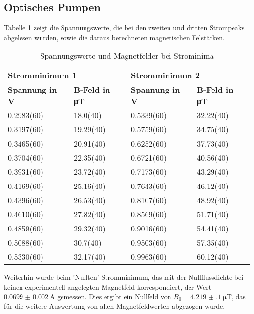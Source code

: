 \documentclass[../main.tex]{subfiles}
\begin{document}
\subsection{Optisches Pumpen}
    Tabelle \ref{tab:PumpenMessdaten} zeigt die Spannungswerte, die bei den zweiten und dritten Strompeaks abgelesen wurden, sowie die daraus berechneten magnetischen Felstärken.

    \begin{table}[H]
        \centering
        \begin{tabular}{l|l|l|l}
            \multicolumn{2}{l|}{\textbf{Stromminimum 1}} & \multicolumn{2}{l}{\textbf{Stromminimum 2}}\\
            \hline
            \textbf{Spannung in V} & \textbf{B-Feld in \si{\micro\tesla}} & \textbf{Spannung in V} & \textbf{B-Feld in \si{\micro\tesla}}\\
            \hline\hline
            0.2983(60) & 18.0(40) & 0.5339(60) & 32.22(40)\\
            \hline
            0.3197(60) & 19.29(40) & 0.5759(60) & 34.75(40)\\
            \hline
            0.3465(60) & 20.91(40) & 0.6252(60) & 37.73(40)\\
            \hline
            0.3704(60) & 22.35(40) & 0.6721(60) & 40.56(40)\\
            \hline
            0.3931(60) & 23.72(40) & 0.7173(60) & 43.29(40)\\
            \hline
            0.4169(60) & 25.16(40) & 0.7643(60) & 46.12(40)\\
            \hline
            0.4396(60) & 26.53(40) & 0.8107(60) & 48.92(40)\\
            \hline
            0.4610(60) & 27.82(40) & 0.8569(60) & 51.71(40)\\
            \hline
            0.4859(60) & 29.32(40) & 0.9016(60) & 54.41(40)\\
            \hline
            0.5088(60) & 30.7(40) & 0.9503(60) & 57.35(40)\\
            \hline
            0.5330(60) & 32.17(40) & 0.9963(60) & 60.12(40)
        \end{tabular}
        \caption{Spannungswerte und Magnetfelder bei Strominima}
        \label{tab:PumpenMessdaten}
    \end{table}

    Weiterhin wurde beim 'Nullten' Stromminimum, das mit der Nullflussdichte bei keinen experimentell angelegten Magnetfeld korrespondiert, der Wert $\SI{0.0699(20)}{\ampere}$ gemessen. Dies ergibt ein Nullfeld von $B_0=\SI{ 4.219(100)}{\micro\tesla}$, das für die weitere Auswertung von allen Magnetfeldwerten abgezogen wurde.
\end{document}
